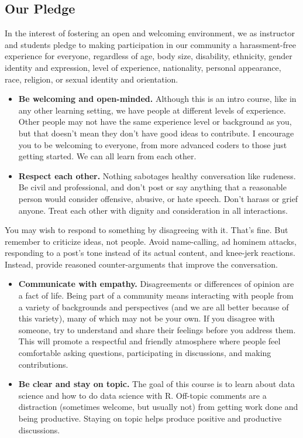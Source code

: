 \documentclass[
]{book}
\begin{document}
\hypertarget{our-pledge}{%
\subsection{Our Pledge}\label{our-pledge}}

In the interest of fostering an open and welcoming environment, we as instructor and students pledge to making participation in our community a harassment-free experience for everyone, regardless of age, body size, disability, ethnicity, gender identity and expression, level of experience, nationality, personal appearance, race, religion, or sexual identity and orientation.

\begin{itemize}
\item
  \textbf{Be welcoming and open-minded.} Although this is an intro course, like in any other learning setting, we have people at different levels of experience. Other people may not have the same experience level or background as you, but that doesn't mean they don't have good ideas to contribute. I encourage you to be welcoming to everyone, from more advanced coders to those just getting started. We can all learn from each other.
\item
  \textbf{Respect each other.} Nothing sabotages healthy conversation like rudeness. Be civil and professional, and don't post or say anything that a reasonable person would consider offensive, abusive, or hate speech. Don't harass or grief anyone. Treat each other with dignity and consideration in all interactions.
\end{itemize}

You may wish to respond to something by disagreeing with it. That's fine. But remember to criticize ideas, not people. Avoid name-calling, ad hominem attacks, responding to a post's tone instead of its actual content, and knee-jerk reactions. Instead, provide reasoned counter-arguments that improve the conversation.

\begin{itemize}
\item
  \textbf{Communicate with empathy.} Disagreements or differences of opinion are a fact of life. Being part of a community means interacting with people from a variety of backgrounds and perspectives (and we are all better because of this variety), many of which may not be your own. If you disagree with someone, try to understand and share their feelings before you address them. This will promote a respectful and friendly atmosphere where people feel comfortable asking questions, participating in discussions, and making contributions.
\item
  \textbf{Be clear and stay on topic.} The goal of this course is to learn about data science and how to do data science with R. Off-topic comments are a distraction (sometimes welcome, but usually not) from getting work done and being productive. Staying on topic helps produce positive and productive discussions.
\end{itemize}
\end{document}
